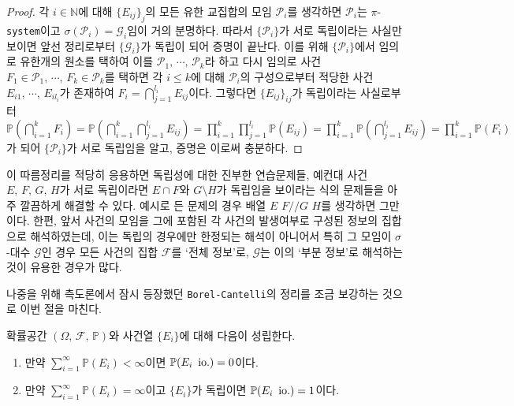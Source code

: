 \begin{proof}
    각 $i\in\mathbb{N}$에 대해 $\{E_{ij}\}_j$의 모든 유한 교집합의 모임 $\mathcal{P}_i$를 생각하면 $\mathcal{P}_i$는 $\pi$-\texttt{system}이고 $\sigma(\mathcal{P}_i)=\mathcal{G}_i$임이 거의 분명하다. 따라서 $\{\mathcal{P}_i\}$가 서로 독립이라는 사실만 보이면 앞선 정리로부터 $\{\mathcal{G}_i\}$가 독립이 되어 증명이 끝난다. 이를 위해 $\{\mathcal{P}_i\}$에서 임의로 유한개의 원소를 택하여 이를 $\mathcal{P}_1,\,\cdots,\,\mathcal{P}_k$라 하고 다시 임의로 사건 $F_1\in\mathcal{P}_1,\,\cdots,\,F_k\in\mathcal{P}_k$를 택하면 각 $i\leq k$에 대해 $\mathcal{P}_i$의 구성으로부터 적당한 사건 $E_{i1},\,\cdots,\,E_{il_i}$가 존재하여 $F_i=\bigcap_{j=1}^{l_i}E_{ij}$이다. 그렇다면 $\{E_{ij}\}_{ij}$가 독립이라는 사실로부터 $\mathbb{P}(\bigcap_{i=1}^kF_i)=\mathbb{P}(\bigcap_{i=1}^k\bigcap_{j=1}^{l_i}E_{ij})=\prod_{i=1}^k\prod_{j=1}^{l_i}\mathbb{P}(E_{ij})=\prod_{i=1}^k\mathbb{P}(\bigcap_{j=1}^{l_i}E_{ij})=\prod_{i=1}^k\mathbb{P}(F_i)$가 되어 $\{\mathcal{P}_i\}$가 서로 독립임을 알고, 증명은 이로써 충분하다.
\end{proof}

이 따름정리를 적당히 응용하면 독립성에 대한 진부한 연습문제들, 예컨대 사건 $E,\,F,\,G,\,H$가 서로 독립이라면 $E\cap F$와 $G\setminus H$가 독립임을 보이라는 식의 문제들을 아주 깔끔하게 해결할 수 있다. 예시로 든 문제의 경우 배열 $E\,\,F//G\,\,H$를 생각하면 그만이다. 한편, 앞서 사건의 모임을 그에 포함된 각 사건의 발생여부로 구성된 정보의 집합으로 해석하였는데, 이는 독립의 경우에만 한정되는 해석이 아니어서 특히 그 모임이 $\sigma$-대수 $\mathcal{G}$인 경우 모든 사건의 집합 $\mathcal{F}$를 `전체 정보'로, $\mathcal{G}$는 이의 `부분 정보'로 해석하는 것이 유용한 경우가 많다.

나중을 위해 측도론에서 잠시 등장했던 \texttt{Borel-Cantelli}의 정리를 조금 보강하는 것으로 이번 절을 마친다.

\begin{theorem}
    확률공간 $(\Omega,\,\mathcal{F},\,\mathbb{P})$와 사건열 $\{E_i\}$에 대해 다음이 성립한다.
    \begin{enumerate}
        \item 만약 $\sum_{i=1}^\infty\mathbb{P}(E_i)<\infty$이면 $\mathbb{P}(E_i\,\,\,\mathrm{io.})=0$이다.
        \item 만약 $\sum_{i=1}^\infty\mathbb{P}(E_i)=\infty$이고 $\{E_i\}$가 독립이면 $\mathbb{P}(E_i\,\,\,\mathrm{io.})=1$이다.
    \end{enumerate}
\end{theorem}

